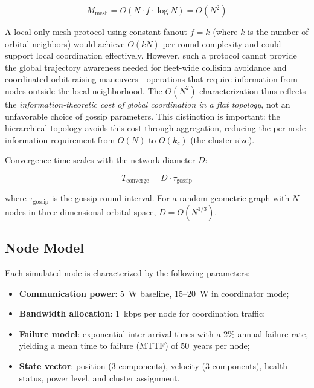 \documentclass[journal]{IEEEtran}
\begin{document}
\begin{equation}
    M_{\text{mesh}} = O(N \cdot f \cdot \log N) = O(N^2)
    \label{eq:mesh_messages}
\end{equation}

A local-only mesh protocol using constant fanout $f = k$ (where $k$ is the number of orbital neighbors) would achieve $O(kN)$ per-round complexity and could support local coordination effectively. However, such a protocol cannot provide the global trajectory awareness needed for fleet-wide collision avoidance and coordinated orbit-raising maneuvers---operations that require information from nodes outside the local neighborhood. The $O(N^2)$ characterization thus reflects the \emph{information-theoretic cost of global coordination in a flat topology}, not an unfavorable choice of gossip parameters. This distinction is important: the hierarchical topology avoids this cost through aggregation, reducing the per-node information requirement from $O(N)$ to $O(k_c)$ (the cluster size).

Convergence time scales with the network diameter $D$:

\begin{equation}
    T_{\text{converge}} = D \cdot \tau_{\text{gossip}}
    \label{eq:mesh_convergence}
\end{equation}

\noindent where $\tau_{\text{gossip}}$ is the gossip round interval. For a random geometric graph with $N$ nodes in three-dimensional orbital space, $D = O(N^{1/3})$.

\subsection{Node Model}

Each simulated node is characterized by the following parameters:

\begin{itemize}
    \item \textbf{Communication power}: 5~W baseline, 15--20~W in coordinator mode;
    \item \textbf{Bandwidth allocation}: 1~kbps per node for coordination traffic;
    \item \textbf{Failure model}: exponential inter-arrival times with a 2\% annual failure rate, yielding a mean time to failure (MTTF) of 50~years per node;
    \item \textbf{State vector}: position (3 components), velocity (3 components), health status, power level, and cluster assignment.
\end{itemize}
\end{document}
